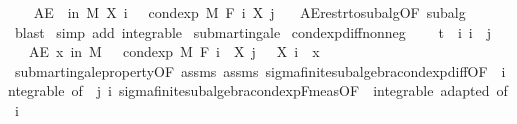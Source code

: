 \begin{isabellebody}
\ \ \isamarkupfalse%
\ {\isachardoublequoteopen}AE\ {\isasymxi}\ in\ M{\isachardot}{\kern0pt}\ X\ i\ {\isasymxi}\ {\isacharequal}{\kern0pt}\ cond{\isacharunderscore}{\kern0pt}exp\ M\ {\isacharparenleft}{\kern0pt}F\ i{\isacharparenright}{\kern0pt}\ {\isacharparenleft}{\kern0pt}X\ j{\isacharparenright}{\kern0pt}\ {\isasymxi}{\isachardoublequoteclose}\ \isamarkupfalse%
\ AE{\isacharunderscore}{\kern0pt}restr{\isacharunderscore}{\kern0pt}to{\isacharunderscore}{\kern0pt}subalg{\isacharbrackleft}{\kern0pt}OF\ subalg{\isacharbrackright}{\kern0pt}\ \isamarkupfalse%
\ blast\isanewline
{}\isamarkupfalse%
\ {\isacharparenleft}{\kern0pt}simp\ add{\isacharcolon}{\kern0pt}\ integrable{\isacharparenright}{\kern0pt}%
\endisatagproof
{\isafoldproof}%
%
\isadelimproof
%
\endisadelimproof
%
\isadelimdocument
%
\endisadelimdocument
%
\isatagdocument
%
\isamarkuptrue%
%
\endisatagdocument
{\isafolddocument}%
%
\isadelimdocument
%
\endisadelimdocument
{}\isamarkupfalse%
\ submartingale\isanewline
{}\isanewline
\isanewline
{}\isamarkupfalse%
\ cond{\isacharunderscore}{\kern0pt}exp{\isacharunderscore}{\kern0pt}diff{\isacharunderscore}{\kern0pt}nonneg{\isacharcolon}{\kern0pt}\ \isanewline
\ \ \ {\isachardoublequoteopen}t\ {\isasymle}\ i{\isachardoublequoteclose}\ {\isachardoublequoteopen}i\ {\isasymle}\ j{\isachardoublequoteclose}\isanewline
\ \ \ {\isachardoublequoteopen}AE\ x\ in\ M{\isachardot}{\kern0pt}\ {}\ {\isasymle}\ cond{\isacharunderscore}{\kern0pt}exp\ M\ {\isacharparenleft}{\kern0pt}F\ i{\isacharparenright}{\kern0pt}\ {\isacharparenleft}{\kern0pt}{\isasymlambda}{\isasymxi}{\isachardot}{\kern0pt}\ X\ j\ {\isasymxi}\ {\isacharminus}{\kern0pt}\ X\ i\ {\isasymxi}{\isacharparenright}{\kern0pt}\ x{\isachardoublequoteclose}\isanewline
%
\isadelimproof
\ \ %
\endisadelimproof
%
\isatagproof
{}\isamarkupfalse%
\ submartingale{\isacharunderscore}{\kern0pt}property{\isacharbrackleft}{\kern0pt}OF\ assms{\isacharbrackright}{\kern0pt}\ assms\ sigma{\isacharunderscore}{\kern0pt}finite{\isacharunderscore}{\kern0pt}subalgebra{\isachardot}{\kern0pt}cond{\isacharunderscore}{\kern0pt}exp{\isacharunderscore}{\kern0pt}diff{\isacharbrackleft}{\kern0pt}OF\ {\isacharunderscore}{\kern0pt}\ integrable{\isacharparenleft}{\kern0pt}{}{\isacharcomma}{\kern0pt}{}{\isacharparenright}{\kern0pt}{\isacharcomma}{\kern0pt}\ of\ {\isacharunderscore}{\kern0pt}\ j\ i{\isacharbrackright}{\kern0pt}\ sigma{\isacharunderscore}{\kern0pt}finite{\isacharunderscore}{\kern0pt}subalgebra{\isachardot}{\kern0pt}cond{\isacharunderscore}{\kern0pt}exp{\isacharunderscore}{\kern0pt}F{\isacharunderscore}{\kern0pt}meas{\isacharbrackleft}{\kern0pt}OF\ {\isacharunderscore}{\kern0pt}\ integrable\ adapted{\isacharcomma}{\kern0pt}\ of\ i{\isacharbrackright}{\kern0pt}\ \isamarkupfalse%

\end{isabellebody}

